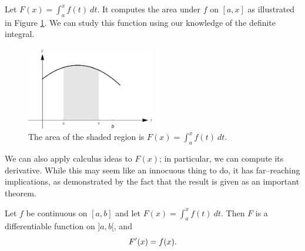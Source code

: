 Let $F(x) = \int_a^x f(t)\ dt$. It computes the area under $f$ on $[a,x]$ as illustrated in Figure \ref{fig_int_10}. We can study this function using our knowledge of the definite integral.  %

\begin{figure}[h]
	\begin{center}
			\includegraphics[width=0.5\textwidth]{fig_int_10}
	\caption{The area of the shaded region is $F(x) = \int_a^x f(t)\ dt$.}
	\label{fig_int_10}
	\end{center}
\end{figure}


We can also apply calculus ideas to $F(x)$; in particular, we can compute its derivative. While this may seem like an innocuous thing to do, it has far--reaching implications, as demonstrated by the fact that the result is given as an important theorem.




\pagebreak
\begin{theorem}\label{thm:FTC1}
Let $f$ be continuous on $[a,b]$ and let $F(x) =  \int_a^x f(t)\ dt$. Then $F$ is a differentiable function on $]a,b[$, and $$F'(x)=f(x).$$
\end{theorem}

\ifanalysis

